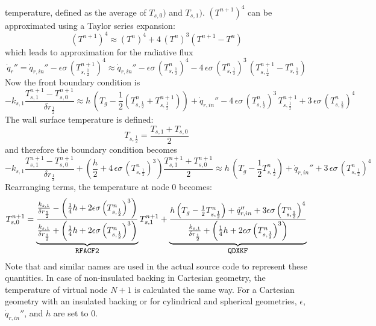 temperature, defined as the average of $T_{s,0})$ and $T_{s,1})$.
$(T^{n+1})^4$ can be approximated using a Taylor series expansion:
\begin{equation}
\label{T_taylor}
(T^{n+1})^4 \approx (T^n)^4 + 4 \, (T^n)^3 (T^{n+1}-T^n)
\end{equation}
which leads to approximation for the radiative flux
\begin{equation}
\label{radi}
\dot{q}_r'' = \dot{q}_{r, in}'' - \epsilon \sigma \, \left( T_{s,\frac{1}{2}}^{n+1} \right)^4
  \approx \dot{q}_{r, in}'' - \epsilon \sigma \, \left( T_{s,\frac{1}{2}}^n \right)^4 - 4 \, \epsilon\sigma \, \left(
T_{s,\frac{1}{2}}^n \right)^3 \, \left( T_{s,\frac{1}{2}}^{n+1}-T_{s,\frac{1}{2}}^n \right)
\end{equation}
Now the front boundary condition is
\begin{equation}
\label{bc_front_2}
  -k_{s,1} \frac{T_{s,1}^{n+1}-T_{s,0}^{n+1}}{\delta r_{\frac{1}{2}}}
  \approx h \, \left( T_g - \frac{1}{2} \left( T_{s,\frac{1}{2}}^n+T_{s,\frac{1}{2}}^{n+1} \right) \right) +
  \dot{q}_{r, in}'' - 4 \, \epsilon\sigma \, \left(T_{s,\frac{1}{2}}^n \right)^3 \, T_{s,\frac{1}{2}}^{n+1} + 3 \, \epsilon\sigma
\, \left( T_{s,\frac{1}{2}}^n \right)^4
\end{equation}
The wall surface temperature is defined:
\begin{equation}
\label{T_front}
  T_{s,\frac{1}{2}} = \frac{T_{s,1}+T_{s,0}}{2}
\end{equation}
and therefore the boundary condition becomes
\begin{equation}
\label{bc_front_4}
  -k_{s,1} \frac{T_{s,1}^{n+1}-T_{s,0}^{n+1}}{\delta r_{\frac{1}{2}}} + \left( \frac{h}{2} + 4 \, \epsilon\sigma \, \left(
T_{s,\frac{1}{2}}^n \right)^3 \right) \frac{T_{s,1}^{n+1}+T_{s,0}^{n+1}}{2}
  \approx h\, \left( T_g - \frac{1}{2}T_{s,\frac{1}{2}}^n \right) +
  \dot{q}_{r, in}'' + 3 \, \epsilon\sigma \, \left( T_{s,\frac{1}{2}}^n \right)^4
\end{equation}
Rearranging terms, the temperature at node 0 becomes:
\begin{equation}
\label{T0}
  T_{s,0}^{n+1} = \underbrace{\frac{\frac{k_{s,1}}{\delta r_{\frac{1}{2}}}- \left(\frac{1}{4}h+2\epsilon \sigma
\left(T_{s,\frac{1}{2}}^n\right)^3 \right)}{\frac{k_{s,1}}{\delta r_{\frac{1}{2}}} + \left(\frac{1}{4}h+2\epsilon \sigma \left(
T_{s,\frac{1}{2}}^n\right)^3 \right)}}_{\texttt{\small RFACF2}} T_{s,1}^{n+1} +
 \underbrace{\frac{h \left(T_g-\frac{1}{2}T_{s,\frac{1}{2}}^n\right)+\dot{q}_{r,in}''+3\epsilon \sigma \left(
T_{s,\frac{1}{2}}^n\right)^4}{\frac{k_{s,1}}{\delta r_{\frac{1}{2}}}+\left(\frac{1}{4}h+2\epsilon \sigma \left(
T_{s,\frac{1}{2}}^n\right)^3 \right)}}_{\texttt{\small QDXKF}}
\end{equation}
Note that  and similar names are used in the actual source code to represent these quantities.
In case of non-insulated backing in Cartesian geometry, the temperature of virtual node $N+1$ is calculated the same way.
For a Cartesian geometry with an insulated backing or for cylindrical and spherical geometries, $\epsilon$, $\dot{q}_{r,in}''$,
and $h$ are set to 0.

